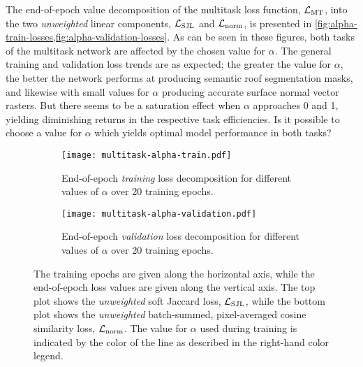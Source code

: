 The end-of-epoch value decomposition of the multitask loss function, $\mathcal{L}_{\mathrm{MT}}$, into the two \emph{unweighted} linear components, $\mathcal{L}_{\mathrm{SJL}}$ and $\mathcal{L}_{\mathrm{norm}}$, is presented in \cref{fig:alpha-train-losses,fig:alpha-validation-losses}.
As can be seen in these figures, both tasks of the multitask network are affected by the chosen value for $\alpha$.
The general training and validation loss trends are as expected; the greater the value for $\alpha$, the better the network performs at producing semantic roof segmentation masks, and likewise with small values for $\alpha$ producing accurate surface normal vector rasters.
But there seems to be a saturation effect when $\alpha$ approaches 0 and 1, yielding diminishing returns in the respective task efficiencies.
Is it possible to choose a value for $\alpha$ which yields optimal model performance in both tasks?
\begin{figure}
  \begin{subfigure}[t]{\textwidth}
    \texttt{[image: multitask-alpha-train.pdf]}
    \caption{%
      End-of-epoch \emph{training} loss decomposition for different values of $\alpha$ over 20 training epochs.
    }
    \label{fig:alpha-train-losses}
  \end{subfigure}
  \begin{subfigure}[t]{\textwidth}
    \texttt{[image: multitask-alpha-validation.pdf]}
    \caption{%
      End-of-epoch \emph{validation} loss decomposition for different values of $\alpha$ over 20 training epochs.
    }
    \label{fig:alpha-validation-losses}
  \end{subfigure}
  \caption[End-of-epoch multitask loss decomposition for different values of $\alpha$ over 20 training epochs.]{%
    The training epochs are given along the horizontal axis, while the end-of-epoch loss values are given along the vertical axis.
    The top plot shows the \emph{unweighted} soft Jaccard loss, $\mathcal{L}_{\mathrm{SJL}}$, while the bottom plot shows the \emph{unweighted} batch-summed, pixel-averaged cosine similarity loss, $\mathcal{L}_{\mathrm{norm}}$.
    The value for $\alpha$ used during training is indicated by the color of the line as described in the right-hand color legend.
  }
\end{figure}

